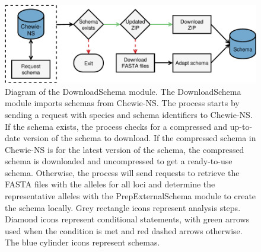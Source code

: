 \newpage
\begin{figure}[h!]
    \centering
    \includegraphics[angle=0,width=\textwidth]{figures/chapter 2/FigureS9.pdf}
    \caption{Diagram of the DownloadSchema module. The DownloadSchema module imports schemas from Chewie-NS. The process starts by sending a request with species and schema identifiers to Chewie-NS. If the schema exists, the process checks for a compressed and up-to-date version of the schema to download. If the compressed schema in Chewie-NS is for the latest version of the schema, the compressed schema is downloaded and uncompressed to get a ready-to-use schema. Otherwise, the process will send requests to retrieve the FASTA files with the alleles for all loci and determine the representative alleles with the PrepExternalSchema module to create the schema locally. Grey rectangle icons represent analysis steps. Diamond icons represent conditional statements, with green arrows used when the condition is met and red dashed arrows otherwise. The blue cylinder icons represent schemas.}
    \label{fig:chap2_figureS9}
\end{figure}

